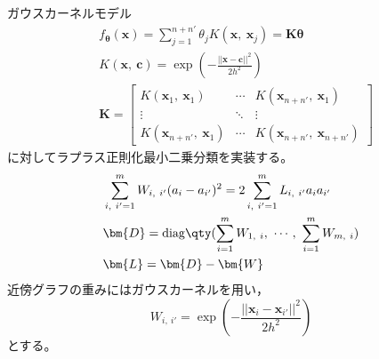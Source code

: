 \documentclass[class=jsarticle, crop=false, dvipdfmx, fleqn]{standalone}
\begin{document}
\section{}

ガウスカーネルモデル
\begin{align}
    & f_{\bm{\theta}} (\bm{x})
        = \sum_{j=1}^{n+n'} \theta_j K(\bm{x},\ \bm{x}_j)
        = \bm{K} \bm{\theta} \\
    & K(\bm{x},\ \bm{c}) = \exp(- \frac{||\bm{x} - \bm{c}||^2}{2 h^2}) \\
    & \bm{K} =
        \begin{bmatrix}
            K(\bm{x}_1,\ \bm{x}_1) & \cdots & K(\bm{x}_{n+n'},\ \bm{x}_1) \\
            \vdots & \ddots & \vdots \\
            K(\bm{x}_{n+n'},\ \bm{x}_1) & \cdots & K(\bm{x}_{n+n'},\ \bm{x}_{n+n'})
        \end{bmatrix}
\end{align}
に対してラプラス正則化最小二乗分類を実装する。
\begin{align}
    & \sum_{i,\ i' = 1}^{m} W_{i,\ i'} (a_i - a_{i'})^2 = 2 \sum_{i,\ i' = 1}^{m} L_{i,\ i'} a_i a_{i'} \\
    & \bm{D} = \mathrm{diag}\qty(\sum_{i=1}^{m} W_{1,\ i},\ \cdots,\ \sum_{i=1}^{m} W_{m,\ i}) \\
    & \bm{L} = \bm{D} - \bm{W}
\end{align}
近傍グラフの重みにはガウスカーネルを用い，
\begin{equation}
    W_{i,\ i'} = \exp(- \frac{||\bm{x}_i - \bm{x}_{i'}||^2}{2 h^2})
\end{equation}
とする。
\end{document}
